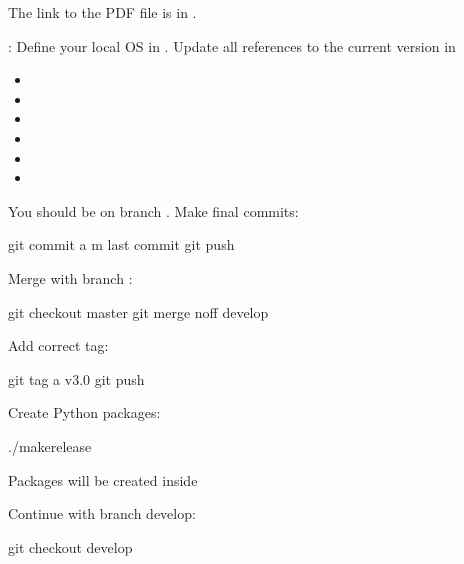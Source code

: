 \documentclass[letterpaper,10pt,english]{sphinxmanual}
\begin{document}
The link to the PDF file is in .

:
Define your local OS in .
Update all references to the current version in
\begin{itemize}
\item {} 

\item {} 

\item {} 

\item {} 

\item {} 

\item {} 

\end{itemize}

You should be on branch .
Make final commits:

\begin{sphinxVerbatim}[commandchars=\\\{\}]
\PYGZdl{} git commit \PYGZhy{}a \PYGZhy{}m \PYGZdq{}last commit\PYGZdq{}
\PYGZdl{} git push
\end{sphinxVerbatim}

Merge with branch :

\begin{sphinxVerbatim}[commandchars=\\\{\}]
\PYGZdl{} git checkout master
\PYGZdl{} git merge \PYGZhy{}\PYGZhy{}no\PYGZhy{}ff develop
\end{sphinxVerbatim}

Add correct tag:

\begin{sphinxVerbatim}[commandchars=\\\{\}]
\PYGZdl{} git tag \PYGZhy{}a v3.0
\PYGZdl{} git push
\end{sphinxVerbatim}

Create Python packages:

\begin{sphinxVerbatim}[commandchars=\\\{\}]
\PYGZdl{} ./make\PYGZus{}release
\end{sphinxVerbatim}

Packages will be created inside 

Continue with branch develop:

\begin{sphinxVerbatim}[commandchars=\\\{\}]
\PYGZdl{} git checkout develop
\end{sphinxVerbatim}



\renewcommand{\indexname}{Index}
\printindex
\end{document}
